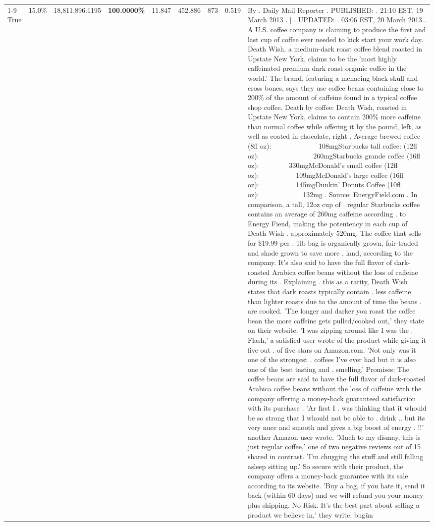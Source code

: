 \begin{table}[H]
{\begin{tabular}{lllrlllll}
\cline{1-9}
True & 15.0\% & 18,811,896.1195 & \bfseries \color{red} 100.0000\% & 11.847 & 452.886 & 873 & 0.519 & By . Daily Mail Reporter . PUBLISHED: . 21:10 EST, 19 March 2013 . | . UPDATED: . 03:06 EST, 20 March 2013 . A U.S. coffee company is claiming to produce the first and last cup of coffee ever needed to kick start your work day. Death Wish, a medium-dark roast coffee blend roasted in Upstate New York, claims to be the 'most highly caffeinated premium dark roast organic coffee in the world.' The brand, featuring a menacing black skull and cross bones, says they use coffee beans containing close to 200\% of the amount of caffeine found in a typical coffee shop coffee. Death by coffee: Death Wish, roasted in Upstate New York, claims to contain 200\% more caffeine than normal coffee while offering it by the pound, left, as well as coated in chocolate, right . Average brewed coffee (8fl oz):              108mgStarbucks tall coffee: (12fl oz):                260mgStarbucks grande coffee (16fl oz):         330mgMcDonald's small coffee (12fl oz):           109mgMcDonald's large coffee (16fl oz):           145mgDunkin' Donuts Coffee (10fl oz):             132mg . Source: EnergyField.com . In comparison, a tall, 12oz cup of . regular Starbucks coffee contains an average of 260mg caffeine according . to Energy Fiend, making the potentency in each cup of Death Wish . approximately 520mg. The coffee that sells for \$19.99 per . 1lb bag is organically grown, fair traded and shade grown to save more . land, according to the company. It's also said to have the full flavor of dark-roasted Arabica coffee beans without the loss of caffeine during its . Explaining . this as a rarity, Death Wish states that dark roasts typically contain . less caffeine than lighter roasts due to the amount of time the beans . are cooked. 'The longer and darker you roast the coffee bean the more caffeine gets pulled/cooked out,' they state on their website. 'I was zipping around like I was the . Flash,' a satisfied user wrote of the product while giving it five out . of five stars on Amazon.com. 'Not only was it one of the strongest . coffees I've ever had but it is also one of the best tasting and . smelling.’ Promises: The coffee beans are said to have the full flavor of dark-roasted Arabica coffee beans without the loss of caffeine with the company offering a money-back guaranteed satisfaction with its purchase . 'Ar first I . was thinking that it whould be so strong that I whould not be able to . drink .. but its very nuce and smooth and gives a big boost of energy . !!' another Amazon user wrote. 'Much to my dismay, this is just regular coffee,' one of two negative reviews out of 15 shared in contrast. 'I'm chugging the stuff and still falling asleep sitting up.' So secure with their product, the company offers a money-back guarantee with its sale according to its website. 'Buy a bag, if you hate it, send it back (within 60 days) and we will refund you your money plus shipping. No Risk. It’s the best part about selling a product we believe in,' they write. bugün \\

\end{tabular}}
\end{table}
